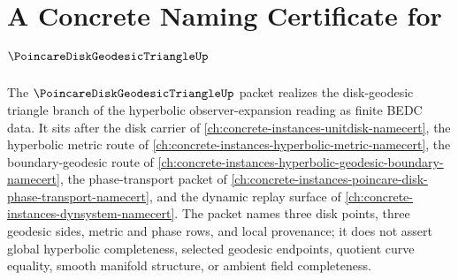 \chapter{A Concrete Naming Certificate for $\PoincareDiskGeodesicTriangleUp$}
\label{ch:concrete-instances-poincare-disk-geodesic-triangle-namecert}

The $\PoincareDiskGeodesicTriangleUp$ packet realizes the disk-geodesic triangle branch of the hyperbolic observer-expansion reading as finite BEDC data. It sits after the disk carrier of \autoref{ch:concrete-instances-unitdisk-namecert}, the hyperbolic metric route of \autoref{ch:concrete-instances-hyperbolic-metric-namecert}, the boundary-geodesic route of \autoref{ch:concrete-instances-hyperbolic-geodesic-boundary-namecert}, the phase-transport packet of \autoref{ch:concrete-instances-poincare-disk-phase-transport-namecert}, and the dynamic replay surface of \autoref{ch:concrete-instances-dynsystem-namecert}. The packet names three disk points, three geodesic sides, metric and phase rows, and local provenance; it does not assert global hyperbolic completeness, selected geodesic endpoints, quotient curve equality, smooth manifold structure, or ambient field completeness.

